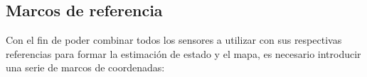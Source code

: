 \subsection{Marcos de referencia}

Con el fin de poder combinar todos los sensores a utilizar con sus respectivas referencias para formar la estimación de estado y el mapa, es necesario introducir una serie de marcos de coordenadas:
